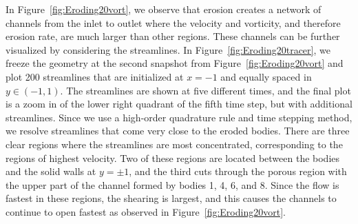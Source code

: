\documentclass[preprint,10pt]{elsarticle}
\begin{document}
In Figure~\ref{fig:Eroding20vort}, we observe that erosion creates a
network of channels from the inlet to outlet where the velocity and
vorticity, and therefore erosion rate, are much larger than other
regions.  These channels can be further visualized by considering the
streamlines.  In Figure~\ref{fig:Eroding20tracer}, we freeze the
geometry at the second snapshot from Figure~\ref{fig:Eroding20vort} and plot 200 streamlines that are initialized at $x=-1$ and equally
spaced in $y \in (-1,1)$.  The streamlines are shown at five different
times, and the final plot is a zoom in of the lower right quadrant of
the fifth time step, but with additional streamlines.  Since we use a
high-order quadrature rule and time stepping method, we resolve
streamlines that come very close to the eroded bodies.  There are three
clear regions where the streamlines are most concentrated, corresponding
to the regions of highest velocity.  Two of these regions are located
between the bodies and the solid walls at $y=\pm 1$, and the third cuts
through the porous region with the upper part of the channel formed by
bodies 1, 4, 6, and 8.  Since the flow is fastest in these regions, the
shearing is largest, and this causes the channels to continue to open
fastest as observed in Figure~\ref{fig:Eroding20vort}.
\end{document}

